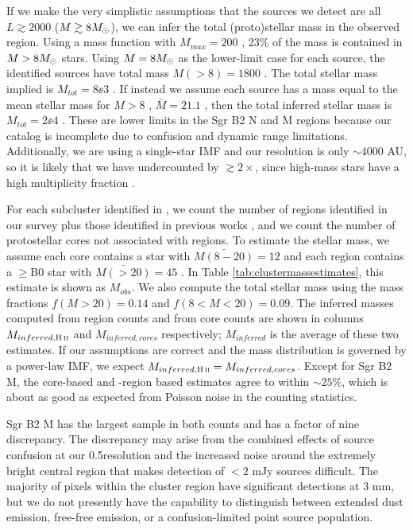 \documentclass[twocolumn]{aastex61}
\begin{document}
If we make the very simplistic assumptions that the sources we detect are all
$L\gtrsim2000$ \lsun ($M\gtrsim8 M_{\odot}$), we can infer the total (proto)stellar
mass in the observed region.  Using a \citet{Kroupa2001a} mass function with
$M_{max}=200$ \msun, 23\% of the mass is contained in $M>8M_{\odot}$ stars.  Using
$M=8M_{\odot}$ as the lower-limit case for each source, the identified sources have
total mass $M(>8)=1800$ \msun.  The total stellar mass implied is $M_{tot} =
8\ee{3}$ \msun.  If instead we assume each source has a mass equal to the mean
stellar mass for $M>8$ \msun, $\bar{M}=21.1$ \msun, then the total inferred
stellar mass is $M_{tot}=2\ee{4}$ \msun.  These are lower limits in the Sgr B2
N and M regions because our catalog is incomplete due to confusion and dynamic
range limitations.  Additionally, we are using a single-star IMF and our
resolution is only $\sim4000$ AU, so it is likely that we have undercounted by
$\gtrsim2\times$, since high-mass stars have a high multiplicity fraction
\citep{Mason2009a}.


For each subcluster identified in \citet{Schmiedeke2016a}, we count the number
of \hii regions identified in our
survey plus those identified in previous works \citep{de-Pree1996a}, and
we count the number of protostellar cores not associated with \hii regions.
To estimate the stellar mass, we assume each core contains a star
with $\bar{M(8-20)} = 12$ \msun and each \hii region contains a $\geq$B0 star
with $\bar{M(>20)} = 45$ \msun.  In Table \ref{tab:clustermassestimates},
this estimate is shown as $M_{obs}$.  We also compute the total stellar
mass using the mass fractions $f(M>20) = 0.14$ and $f(8<M<20)=0.09$.
The inferred masses computed from \hii region counts and from core
counts are shown in columns $M_{inferred,\hii}$ and $M_{inferred,cores}$
respectively; $M_{inferred}$ is the average of these two estimates.
If our assumptions are correct and the mass distribution is governed
by a power-law IMF, we expect $M_{inferred,\hii} = M_{inferred,cores}$.
Except for Sgr B2 M, the core-based and \hii-region based estimates agree
to within $\sim25\%$, which is about as good as expected from Poisson
noise in the counting statistics.  

Sgr B2 M has the largest sample in both counts and has a factor of nine
discrepancy. The discrepancy may arise from the combined effects of source
confusion at our 0.5\arcsec resolution and the increased noise around the
extremely bright central region that makes detection of $<2$ mJy sources
difficult.  The majority of pixels within the cluster region have significant
detections at 3 mm, but we do not presently have the capability to distinguish
between extended dust emission, free-free emission, or a confusion-limited
point source population.
\end{document}
